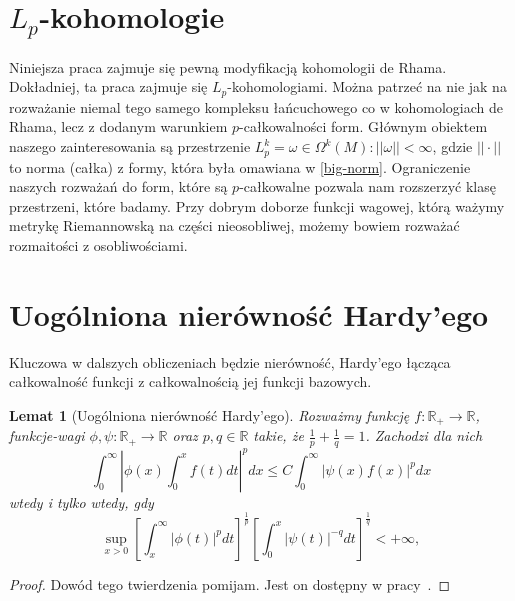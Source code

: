 \documentclass[licencjacka]{pracamgr}
\theoremstyle{definition}
\theoremstyle{definition}
\theoremstyle{plain}
\newtheorem{lemma}{Lemat}[section]
\theoremstyle{plain}
\theoremstyle{plain}
\theoremstyle{plain}
\begin{document}
\section{$L_p$-kohomologie}
Niniejsza praca zajmuje się pewną modyfikacją kohomologii de Rhama.
Dokładniej, ta praca zajmuje się $L_p$-kohomologiami. Można patrzeć
na nie jak na rozważanie niemal tego samego kompleksu łańcuchowego co w
kohomologiach de Rhama, lecz z dodanym warunkiem $p$-całkowalności form. Głównym
obiektem naszego zainteresowania są przestrzenie 
$L_p^k = {\omega \in \Omega^k(M): ||\omega|| <\infty}$, gdzie $|| \cdot ||$
to norma (całka) z formy, która była omawiana w \ref{big-norm}. Ograniczenie
naszych rozważań do form, które są $p$-całkowalne pozwala nam rozszerzyć
klasę przestrzeni, które badamy. Przy dobrym doborze funkcji wagowej, którą
ważymy metrykę Riemannowską na części nieosobliwej, możemy
bowiem rozważać rozmaitości z osobliwościami.\\


\section{Uogólniona nierówność Hardy'ego}
Kluczowa w dalszych obliczeniach będzie nierówność, Hardy'ego łącząca całkowalność
funkcji z całkowalnością jej funkcji bazowych.

\begin{lemma}[Uogólniona nierówność Hardy'ego]\label{hardy}
    Rozważmy funkcję $f: \mathbb{R}_{+} \rightarrow \mathbb{R}$, funkcje-wagi
    $\phi, \psi: \mathbb{R}_{+} \rightarrow \mathbb{R}$ oraz $p, q \in
    \mathbb{R}$ takie, że $\frac{1}{p} + \frac{1}{q} = 1 $.  Zachodzi dla nich
\[
\int_0^\infty \left|
                \phi(x) \int_0^x f(t) dt
              \right|^p dx
\leq
C \int_0^\infty \left|
                    \psi(x)  f(x)
                \right|^p dx
\]
wtedy i tylko wtedy, gdy
\[
\sup_{x > 0}
\left[
\int_x^\infty  
   | \phi(t) |^p dt
\right]^{\frac{1}{p}}
\left[
\int_0^x
    | \psi(t) |^{-q} dt
\right]^{\frac{1}{q}} < + \infty,
\]
\end{lemma}
\begin{proof}
Dowód tego twierdzenia pomijam. Jest on dostępny w pracy~\cite{hardys}.
\end{proof}
\end{document}
